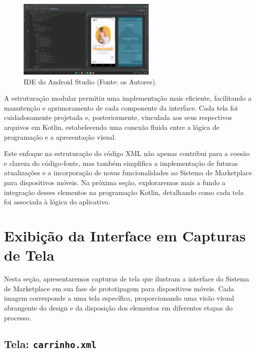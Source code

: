 \documentclass[
	12pt,				%
	openright,			%
	twoside,			%
	a4paper,			%
	english,			%
	brazil				%
	]{abntex2}
\begin{document}
\begin{figure}[htb]
    \centering
    \includegraphics[width=0.6\textwidth]{img/IDE-android-studio}
    \caption{IDE do Android Studio (Fonte: os Autores).}
    \label{fig:ide_android_studio}
\end{figure}

A estruturação modular permitiu uma implementação mais eficiente, facilitando a manutenção e aprimoramento de cada componente da interface. Cada tela foi cuidadosamente projetada e, posteriormente, vinculada aos seus respectivos arquivos em Kotlin, estabelecendo uma conexão fluida entre a lógica de programação e a apresentação visual.

Este enfoque na estruturação do código XML não apenas contribui para a coesão e clareza do código-fonte, mas também simplifica a implementação de futuras atualizações e a incorporação de novas funcionalidades ao Sistema de Marketplace para dispositivos móveis. Na próxima seção, exploraremos mais a fundo a integração desses elementos na programação Kotlin, detalhando como cada tela foi associada à lógica do aplicativo.

\section{Exibição da Interface em Capturas de Tela}

Nesta seção, apresentaremos capturas de tela que ilustram a interface do Sistema de Marketplace em sua fase de prototipagem para dispositivos móveis. Cada imagem corresponde a uma tela específica, proporcionando uma visão visual abrangente do design e da disposição dos elementos em diferentes etapas do processo.

\subsection{Tela: \texttt{carrinho.xml}}
\end{document}
